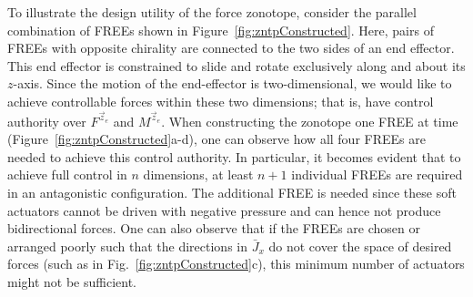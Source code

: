 To illustrate the design utility of the force zonotope, consider the parallel combination of FREEs shown in Figure~\ref{fig:zntpConstructed}.
Here, pairs of FREEs with opposite chirality are connected to the two sides of an end effector.
This end effector is constrained to slide and rotate exclusively along and about its $z$-axis.
Since the motion of the end-effector is two-dimensional, we would like to achieve controllable forces within these two dimensions; that is, have control authority over $F^{\vec{z}_e}$ and $M^{\vec{z}_e}$.
When constructing the zonotope one FREE at time (Figure~\ref{fig:zntpConstructed}a-d), one can observe how all four FREEs are needed to achieve this control authority.
In particular, it becomes evident that to achieve full control in $n$ dimensions, at least $n+1$ individual FREEs are required in an antagonistic configuration.
The additional FREE is needed since these soft actuators cannot be driven with negative pressure and can hence not produce bidirectional forces.
One can also observe that if the FREEs are chosen or arranged poorly such that the directions in $\bar{J}_{x}$ do not cover the space of desired forces (such as in Fig.~\ref{fig:zntpConstructed}c), this minimum number of actuators might not be sufficient.























